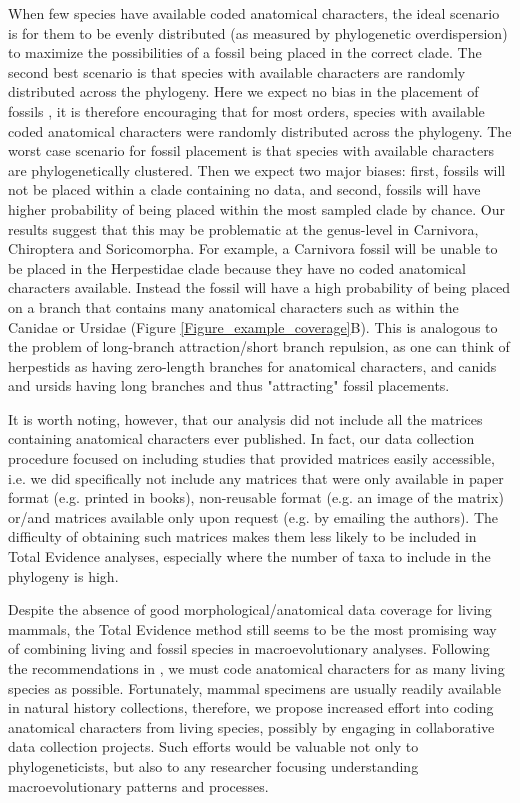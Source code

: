 \documentclass[12pt,letterpaper]{article}
\begin{document}
When few species have available coded anatomical characters, the ideal scenario is for them to be evenly distributed (as measured by phylogenetic overdispersion) to maximize the possibilities of a fossil being placed in the correct clade.
The second best scenario is that species with available characters are randomly distributed across the phylogeny. 
Here we expect no bias in the placement of fossils \cite{GuillermeCooper}, it is therefore encouraging that for most orders, species with available coded anatomical characters were randomly distributed across the phylogeny.
The worst case scenario for fossil placement is that species with available characters are phylogenetically clustered. 
Then we expect two major biases: first, fossils will not be placed within a clade containing no data, and second, fossils will have higher probability of being placed within the most sampled clade by chance. 
Our results suggest that this may be problematic at the genus-level in Carnivora, Chiroptera and Soricomorpha. 
For example, a Carnivora fossil will be unable to be placed in the Herpestidae clade because they have no coded anatomical characters available.
Instead the fossil will have a high probability of being placed on a branch that contains many anatomical characters such as within the Canidae or Ursidae (Figure \ref{Figure_example_coverage}B). 
This is analogous to the problem of long-branch attraction/short branch repulsion, as one can think of herpestids as having zero-length branches for anatomical characters, and canids and ursids having long branches and thus "attracting" fossil placements.

It is worth noting, however, that our analysis did not include all the matrices containing anatomical characters ever published.
In fact, our data collection procedure focused on including studies that provided matrices easily accessible, i.e. we did specifically not include any matrices that were only available in paper format (e.g. printed in books), non-reusable format (e.g. an image of the matrix)  or/and matrices available only upon request (e.g. by emailing the authors).
The difficulty of obtaining such matrices makes them less likely to be included in Total Evidence analyses, especially where the number of taxa to include in the phylogeny is high.

Despite the absence of good morphological/anatomical data coverage for living mammals, the Total Evidence method still seems to be the most promising way of combining living and fossil species in macroevolutionary analyses.
Following the recommendations in \cite{GuillermeCooper}, we must code anatomical characters for as many living species as possible. 
Fortunately, mammal specimens are usually readily available in natural history collections, therefore, we propose increased effort into coding anatomical characters from living species, possibly by engaging in collaborative data collection projects.
Such efforts would be valuable not only to phylogeneticists, but also to any researcher focusing understanding macroevolutionary patterns and processes.
\end{document}

